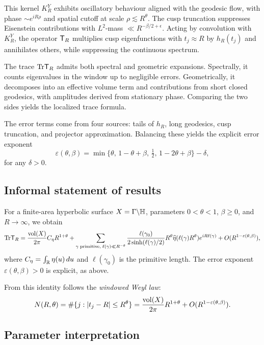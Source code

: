 This kernel $K_R^Y$ exhibits oscillatory behaviour aligned with the geodesic flow, with phase $\sim e^{iR\rho}$ and spatial cutoff at scale $\rho \lesssim R^\theta$. The cusp truncation suppresses Eisenstein contributions with $L^2$-mass $\ll R^{-\beta/2+\epsilon}$. Acting by convolution with $K_R^Y$, the operator $\mathsf{T}_R$ multiplies cusp eigenfunctions with $t_j \approx R$ by $h_R(t_j)$ and annihilates others, while suppressing the continuous spectrum.

The trace $\mathrm{Tr} \mathsf{T}_R$ admits both spectral and geometric expansions. Spectrally, it counts eigenvalues in the window up to negligible errors. Geometrically, it decomposes into an effective volume term and contributions from short closed geodesics, with amplitudes derived from stationary phase. Comparing the two sides yields the localized trace formula.

The error terms come from four sources: tails of $h_R$, long geodesics, cusp truncation, and projector approximation. Balancing these yields the explicit error exponent
\[
   \varepsilon(\theta,\beta) = \min\Big\{ \theta,\, 1-\theta+\beta,\, \tfrac{1}{2},\, 1-2\theta+\beta \Big\} - \delta,
\]
for any $\delta > 0$.

\subsection{Informal statement of results}\label{subsec:informal}

For a finite-area hyperbolic surface $X = \Gamma\backslash \mathbb{H}$, parameters $0<\theta<1$, $\beta \ge 0$, and $R \to \infty$, we obtain
\[
   \mathrm{Tr} \mathsf{T}_R = \frac{\operatorname{vol}(X)}{2\pi} C_\eta R^{1+\theta} + \sum_{\gamma \;\text{primitive},\;\ell(\gamma)\ll R^{-\theta}} 
      \frac{\ell(\gamma_0)}{2\sinh(\ell(\gamma)/2)} R^\theta \widehat{\eta}(\ell(\gamma) R^\theta) e^{iR\ell(\gamma)}
      + O(R^{1-\varepsilon(\theta,\beta)}),
\]
where $C_\eta = \int_{\mathbb{R}} \eta(u)\,du$ and $\ell(\gamma_0)$ is the primitive length. The error exponent $\varepsilon(\theta,\beta)>0$ is explicit, as above.

From this identity follows the \emph{windowed Weyl law}:
\[
   N(R,\theta) = \#\{ j : |t_j-R|\le R^\theta\} 
      = \frac{\operatorname{vol}(X)}{2\pi} R^{1+\theta} + O(R^{1-\varepsilon(\theta,\beta)}).
\]

\subsection{Parameter interpretation}\label{subsec:params}

